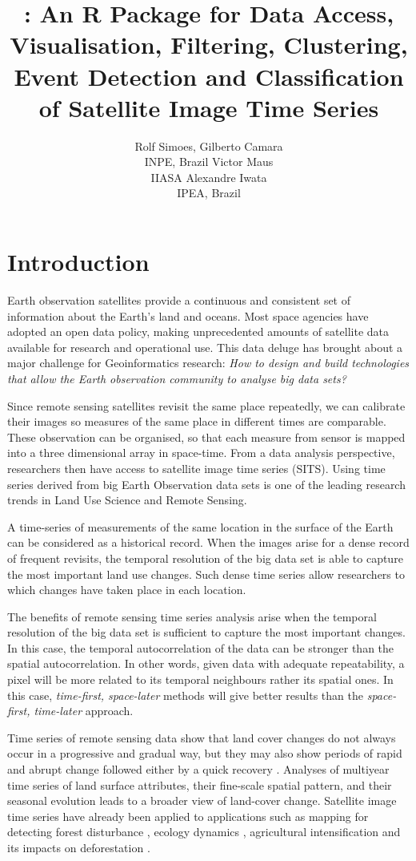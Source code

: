 \documentclass[article,shortnames]{jss}
\author{
Rolf Simoes, Gilberto Camara\\INPE, Brazil \And Victor Maus\\IIASA \And Alexandre Iwata\\IPEA, Brazil
}
\title{\pkg{SITS}: An R Package for Data Access, Visualisation, Filtering,
Clustering, Event Detection and Classification of Satellite Image Time
Series}
\begin{document}
\section{Introduction}\label{introduction}

Earth observation satellites provide a continuous and consistent set of
information about the Earth's land and oceans. Most space agencies have
adopted an open data policy, making unprecedented amounts of satellite
data available for research and operational use. This data deluge has
brought about a major challenge for Geoinformatics research:
\textit{How to design and build technologies that allow the Earth observation community to analyse big data sets?}

Since remote sensing satellites revisit the same place repeatedly, we
can calibrate their images so measures of the same place in different
times are comparable. These observation can be organised, so that each
measure from sensor is mapped into a three dimensional array in
space-time. From a data analysis perspective, researchers then have
access to satellite image time series (SITS). Using time series derived
from big Earth Observation data sets is one of the leading research
trends in Land Use Science and Remote Sensing.

A time-series of measurements of the same location in the surface of the
Earth can be considered as a historical record. When the images arise
for a dense record of frequent revisits, the temporal resolution of the
big data set is able to capture the most important land use changes.
Such dense time series allow researchers to which changes have taken
place in each location.

The benefits of remote sensing time series analysis arise when the
temporal resolution of the big data set is sufficient to capture the
most important changes. In this case, the temporal autocorrelation of
the data can be stronger than the spatial autocorrelation. In other
words, given data with adequate repeatability, a pixel will be more
related to its temporal neighbours rather its spatial ones. In this
case, \textit{time-first, space-later} methods will give better results
than the \textit{space-first, time-later} approach.

Time series of remote sensing data show that land cover changes do not
always occur in a progressive and gradual way, but they may also show
periods of rapid and abrupt change followed either by a quick recovery
\citep{Lambin2006}. Analyses of multiyear time series of land surface
attributes, their fine-scale spatial pattern, and their seasonal
evolution leads to a broader view of land-cover change. Satellite image
time series have already been applied to applications such as mapping
for detecting forest disturbance \citep{Kennedy2010}, ecology dynamics
\citep{Pasquarella2016}, agricultural intensification
\citep{Galford2008} and its impacts on deforestation \citep{Arvor2012}.
\end{document}
